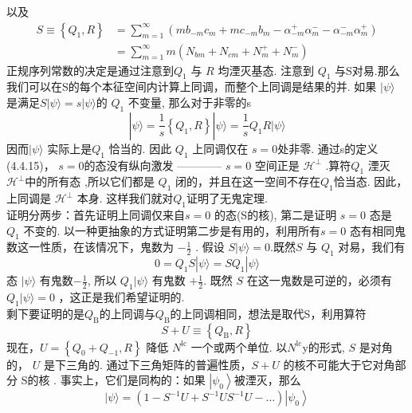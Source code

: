 以及
\begin{equation}
\begin{aligned}
S \equiv\left\{Q_{1}, R\right\} &=\sum_{m=1}^{\infty}\left(m b_{-m} c_{m}+m c_{-m} b_{m}-\alpha_{-m}^{+} \alpha_{m}^{-}-\alpha_{-m}^{-} \alpha_{m}^{+}\right) \\
&=\sum_{m=1}^{\infty} m\left(N_{b m}+N_{c m}+N_{m}^{+}+N_{m}^{-}\right)
\end{aligned}
\end{equation}
正规序列常数的决定是通过注意到$Q_{1}$ 与 $R$ 均湮灭基态. 注意到 $Q_{1}$ 与S对易.那么我们可以在S的每个本征空间内计算上同调，而整个上同调是结果的并. 如果 $|\psi\rangle$ 是满足$S|\psi\rangle=s|\psi\rangle$的 $Q_{1}$ 不变量, 那么对于非零的s
\begin{equation}
|\psi\rangle=\frac{1}{s}\left\{Q_{1}, R\right\}|\psi\rangle=\frac{1}{s} Q_{1} R|\psi\rangle
\end{equation}
因而$|\psi\rangle$ 实际上是$Q_{1}$ 恰当的. 因此 $Q_{1}$ 上同调仅在 $s=0$处非零. 通过s的定义 (4.4.15)， $s=0$的态没有纵向激发 ———— $s=0$ 空间正是 $\mathscr{H}^{\perp} $ .算符$Q_{1}$ 湮灭 $\mathscr{H}^{\perp}$中的所有态 ,所以它们都是 $Q_{1}$ 闭的，并且在这一空间不存在$Q_{1}$恰当态. 因此，上同调是 $\mathscr{H}^{\perp}$ 本身. 这样我们就对$Q_{1}$证明了无鬼定理.\\
证明分两步：首先证明上同调仅来自$s=0$ 的态(S的核), 第二是证明 $s=0$ 态是 $Q_{1}$ 不变的. 以一种更抽象的方式证明第二步是有用的，利用所有$s=0$ 态有相同鬼数这一性质，在该情况下，鬼数为 $-\frac{1}{2} $ . 假设 $S|\psi\rangle=0$.既然$S$ 与 $Q_{1}$ 对易，我们有
\begin{equation}
0=Q_{1} S|\psi\rangle=S Q_{1}|\psi\rangle
\end{equation}
态 $|\psi\rangle$ 有鬼数$-\frac{1}{2}$, 所以 $Q_{1}|\psi\rangle$ 有鬼数 $+\frac{1}{2}$. 既然 $S$ 在这一鬼数是可逆的，必须有 $Q_{1}|\psi\rangle=0$ ，这正是我们希望证明的.\\
剩下要证明的是$Q_{\mathrm{B}}$的上同调与$Q_{\mathrm{B}}$的上同调相同，想法是取代S，利用算符
\begin{equation}
S+U \equiv\left\{Q_{\mathrm{B}}, R\right\}
\end{equation}
现在，$U=\left\{Q_{0}+Q_{-1}, R\right\}$ 降低 $N^{\mathrm{lc}}$ 一个或两个单位. 以$N^{\mathrm{lc}} \mathrm{y}$的形式, $S$ 是对角的， $U$ 是下三角的. 通过下三角矩阵的普遍性质，$S+U$ 的核不可能大于它对角部分 S的核 . 事实上，它们是同构的：如果 $\left|\psi_{0}\right\rangle$被湮灭，那么
\begin{equation}
|\psi\rangle=\left(1-S^{-1} U+S^{-1} U S^{-1} U-\ldots\right)\left|\psi_{0}\right\rangle
\end{equation}
